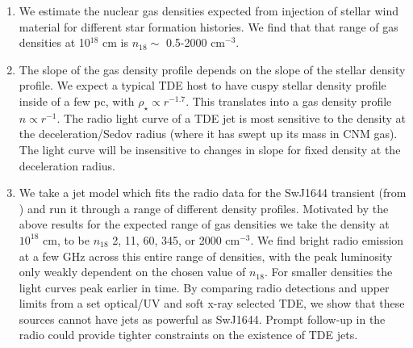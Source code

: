 \documentclass[usenatbib,fleqn]{mnras}
\begin{document}
\begin{enumerate}
\item We estimate the nuclear gas densities expected from injection of
  stellar wind material for different star formation histories. We
  find that that range of gas densities at 10$^{18}$ cm is $n_{18}
  \sim$ 0.5-2000 cm$^{-3}$.

\item The slope of the gas density profile depends on the slope of the
  stellar density profile. We expect a typical TDE host to have cuspy
  stellar density profile inside of a few pc, with $\rho_\star
  \propto r^{-1.7}$. This translates into a gas density profile $n
  \propto r^{-1}$. The radio light curve of a TDE jet is most
  sensitive to the density at the deceleration/Sedov radius (where it
  has swept up its mass in CNM gas). The light curve will be
  insensitive to changes in slope for fixed density at the
  deceleration radius.

\item We take a jet model which fits the radio data for the SwJ1644
  transient (from \citealt{Mimica+2015}) and run it through a range of
  different density profiles. Motivated by the above results for the
  expected range of gas densities we take the density at $10^{18}$ cm,
  to be $n_{18}$ 2, 11, 60, 345, or 2000 cm$^{-3}$. We find bright radio
  emission at a few GHz across this entire range of densities, with
  the peak luminosity only weakly dependent on the chosen value of
  $n_{18}$.  For smaller densities the light curves peak earlier in
  time. By comparing radio detections and upper limits from a set
  optical/UV and soft x-ray selected TDE, we show that these sources
  cannot have jets as powerful as SwJ1644. Prompt follow-up in the
  radio could provide tighter constraints on the existence of TDE
  jets.
\end{enumerate}

\appendix
\end{document}
